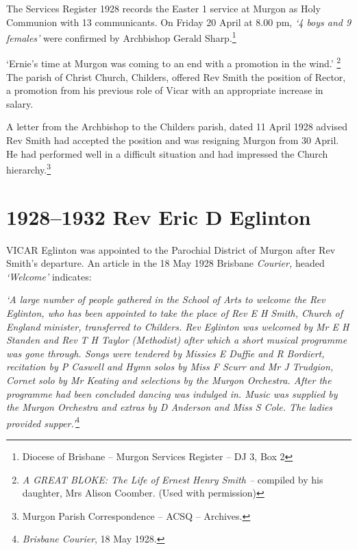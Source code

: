 The Services Register 1928 records the Easter 1 service at Murgon as Holy Communion with 13 communicants. On Friday 20 April at 8.00 pm, \emph{`4 boys and 9 females'} were confirmed by Archbishop Gerald Sharp.\footnote{Diocese of Brisbane -- Murgon Services Register -- DJ 3, Box 2}


`Ernie's time at Murgon was coming to an end with a promotion in the wind.' \footnote{\emph{A GREAT BLOKE: The Life of Ernest Henry Smith --} compiled by his daughter, Mrs Alison Coomber. (Used with permission)} The parish of Christ Church, Childers, offered Rev Smith the position of Rector, a promotion from his previous role of Vicar with an appropriate increase in salary.


A letter from the Archbishop to the Childers parish, dated 11 April 1928 advised Rev Smith had accepted the position and was resigning Murgon from 30 April. He had performed well in a difficult situation and had impressed the Church hierarchy.\footnote{Murgon Parish Correspondence -- ACSQ -- Archives.}


\balance


\printendnotes[custom]
\setcounter{endnote}{0}
\chapter{1928--1932 Rev Eric D Eglinton}
\nobalance


\lettrine[lines=3]{V}{ICAR}
 Eglinton was appointed to the Parochial District of Murgon after Rev Smith's departure. An article in the 18 May 1928 Brisbane \emph{Courier,} headed \emph{`Welcome'} indicates:

\emph{`A large number of people gathered in the School of Arts to welcome the Rev Eglinton, who has been appointed to take the place of Rev E H Smith, Church of England minister, transferred to Childers. Rev Eglinton was welcomed by Mr E H Standen and Rev T H Taylor (Methodist) after which a short musical programme was gone through. Songs were tendered by Missies E Duffie and R Bordiert, recitation by P Caswell and Hymn solos by Miss F Scurr and Mr J Trudgion, Cornet solo by Mr Keating and selections by the Murgon Orchestra. After the programme had been concluded dancing was indulged in. Music was supplied by the Murgon Orchestra and extras by D Anderson and Miss S Cole. The ladies provided supper.'}\footnote{\emph{Brisbane Courier}, 18 May 1928.}


